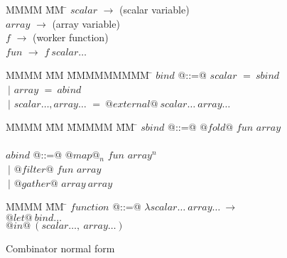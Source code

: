 \begin{figure}
\begin{tabbing}
MMMM        \= MM \= \kill
$scalar$    \> $\to$ \> (scalar variable)      \\
$array$     \> $\to$ \> (array variable)       \\
$f$         \> $\to$ \> (worker function)      \\
$fun$       \> $\to$ \> $f~scalar\ldots$          \\
\end{tabbing}
\begin{tabbing}
MMMM        \= MM \= MMMMMMMMM \= \kill
$bind$      \> @::=@ \> $scalar$ \> $=~sbind$ \\
            \> $~|$    \> $array$  \> $=~abind$ \\
            \> $~|$    \> $scalar\ldots,array\ldots$  \> $=~@external@~scalar\ldots~array\ldots$
\end{tabbing}
\begin{tabbing}
MMMM        \= MM \= MMMMM \= MM \= \kill
$sbind$     \> @::=@ \> $@fold@$  \> $fun$ \> $array$ \\
\\[2ex]

$abind$     \> @::=@ \> $@map@_n$ \> $fun$ \> $array^n$ \\
            \> $~|$    \> $@filter@$\> $fun$ \> $array$ \\
            \> $~|$    \> $@gather@$\>       \> $array~array$ \\
\end{tabbing}
\begin{tabbing}
MMMM        \= MM \= \kill
$function$  \> @::=@ \> $\lambda scalar\ldots~array\ldots~\to$      \\
            \>          \> $@let@~bind\ldots$                  \\
            \>          \> $@in@~(scalar\ldots,~array\ldots)$    \\
\end{tabbing}
\caption{Combinator normal form}
\label{f:CombinatorNormalForm}
\end{figure}

